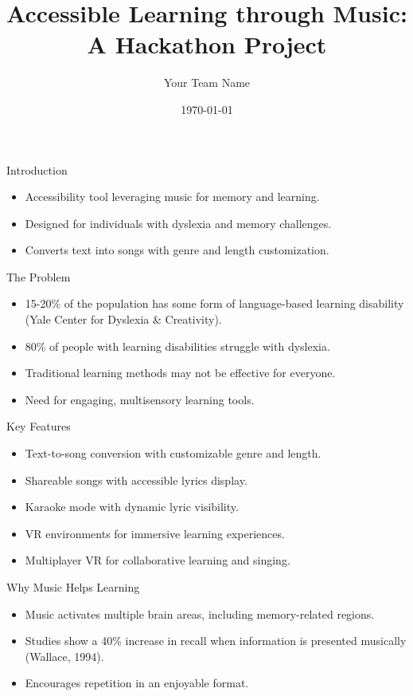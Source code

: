 \documentclass{beamer}
\title{Accessible Learning through Music: A Hackathon Project}
\author{Your Team Name}
\date{\today}
\begin{document}
\begin{frame}
    \titlepage
\end{frame}

\begin{frame}{Introduction}
    \begin{itemize}
        \item Accessibility tool leveraging music for memory and learning.
        \item Designed for individuals with dyslexia and memory challenges.
        \item Converts text into songs with genre and length customization.
    \end{itemize}
\end{frame}

\begin{frame}{The Problem}
    \begin{itemize}
        \item 15-20\% of the population has some form of language-based learning disability (Yale Center for Dyslexia & Creativity).
        \item 80\% of people with learning disabilities struggle with dyslexia.
        \item Traditional learning methods may not be effective for everyone.
        \item Need for engaging, multisensory learning tools.
    \end{itemize}
\end{frame}

\begin{frame}{Key Features}
    \begin{itemize}
        \item Text-to-song conversion with customizable genre and length.
        \item Shareable songs with accessible lyrics display.
        \item Karaoke mode with dynamic lyric visibility.
        \item VR environments for immersive learning experiences.
        \item Multiplayer VR for collaborative learning and singing.
    \end{itemize}
\end{frame}

\begin{frame}{Why Music Helps Learning}
    \begin{itemize}
        \item Music activates multiple brain areas, including memory-related regions.
        \item Studies show a 40\% increase in recall when information is presented musically (Wallace, 1994).
        \item Encourages repetition in an enjoyable format.
    \end{itemize}
\end{frame}
\end{document}
